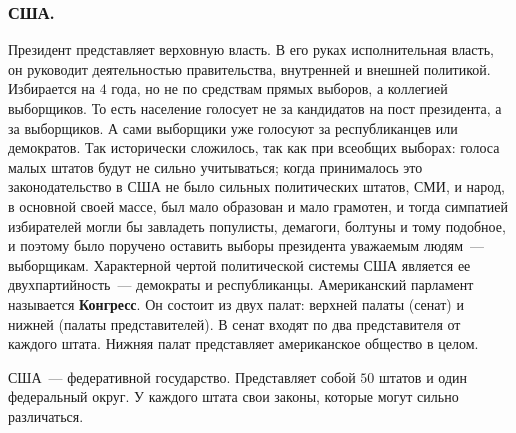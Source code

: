 \documentclass[12pt]{article}
\begin{document}
	\subsubsection{США.}
	\begin{note}
		Президент представляет верховную власть. В его руках исполнительная власть, он руководит деятельностью правительства, внутренней и внешней политикой. Избирается на $4$ года, но не по средствам прямых выборов, а коллегией выборщиков. То есть население голосует не за кандидатов на пост президента, а за выборщиков. А сами выборщики уже голосуют за республиканцев или демократов. Так исторически сложилось, так как при всеобщих выборах: голоса малых штатов будут не сильно учитываться; когда принималось это законодательство в США не было сильных политических штатов, СМИ, и народ, в основной своей массе, был мало образован и мало грамотен, и тогда симпатией избирателей могли бы завладеть популисты, демагоги, болтуны и тому подобное, и поэтому было поручено оставить выборы президента уважаемым людям~--- выборщикам. Характерной чертой политической системы США является ее двухпартийность~--- демократы и республиканцы. Американский парламент называется \textbf{Конгресс}. Он состоит из двух палат: верхней палаты (сенат) и нижней (палаты представителей). В сенат входят по два представителя от каждого штата. Нижняя палат представляет американское общество в целом.
	\end{note}
	\begin{note}
		США~--- федеративной государство. Представляет собой $50$ штатов и один федеральный округ. У каждого штата свои законы, которые могут сильно различаться.
	\end{note}
\end{document}
